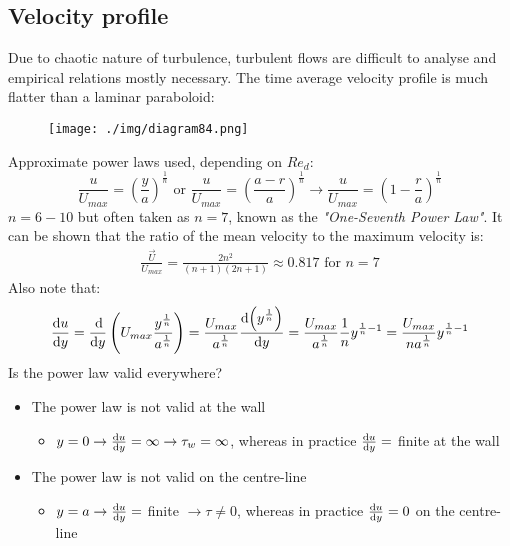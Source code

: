 \subsection{Velocity profile}
Due to chaotic nature of turbulence, turbulent flows are difficult to analyse and empirical relations mostly necessary. The time average velocity profile is much flatter than a laminar paraboloid:
\begin{figure}[H]
  \centering
  \texttt{[image: ./img/diagram84.png]}
  \caption{}
\end{figure}
Approximate power laws used, depending on $Re_d$:
\begin{equation}
  \frac{u}{U_{max}} = \left( \frac{y}{a}\right)^{\frac{1}{n}} \textrm{ or } \frac{u}{U_{max}} = \left(\frac{a-r}{a}\right)^{\frac{1}{n}} \rightarrow \frac{u}{U_{max}} = \left(1-\frac{r}{a}\right)^{\frac{1}{n}}
\end{equation}
$n = 6-10$ but often taken as $n=7$, known as the \textit{"One-Seventh Power Law"}. It can be shown that the ratio of the mean velocity to the maximum velocity is:
\begin{align}
  \frac{\vec{U}}{U_{max}} = \frac{2n^2}{\left(n+1\right)\left(2n+1\right)}\approx 0.817 \textrm{ for }n=7
\end{align}
Also note that:
\begin{align}
  \frac{\dif u}{\dif y} = \frac{\dif}{\dif y}\left(U_{max} \frac{y^{\frac{1}{n}}}{a^{\frac{1}{n}}}\right) = \frac{U_{max}}{a^{\frac{1}{n}}} \frac{\dif\left(y^{\frac{1}{n}}\right)}{\dif y} = \frac{U_{max}}{a^{\frac{1}{n}}}\frac{1}{n}y^{\frac{1}{n}-1} = \frac{U_{max}}{na^{\frac{1}{n}}}y^{\frac{1}{n}-1}
\end{align}
Is the power law valid everywhere?
\begin{itemize}
  \item The power law is not valid at the wall
        \begin{itemize}
          \item $y = 0 \rightarrow \frac{\dif u}{\dif y} = \infty \rightarrow \tau_w = \infty$, whereas in practice $\frac{\dif u}{\dif y} =$ finite at the wall
        \end{itemize}
  \item The power law is not valid on the centre-line
        \begin{itemize}
          \item $y = a \rightarrow \frac{\dif u}{\dif y} =$ finite $\rightarrow \tau \neq 0$, whereas in practice $\frac{\dif u}{\dif y}= 0$ on the centre-line
        \end{itemize}
\end{itemize}
